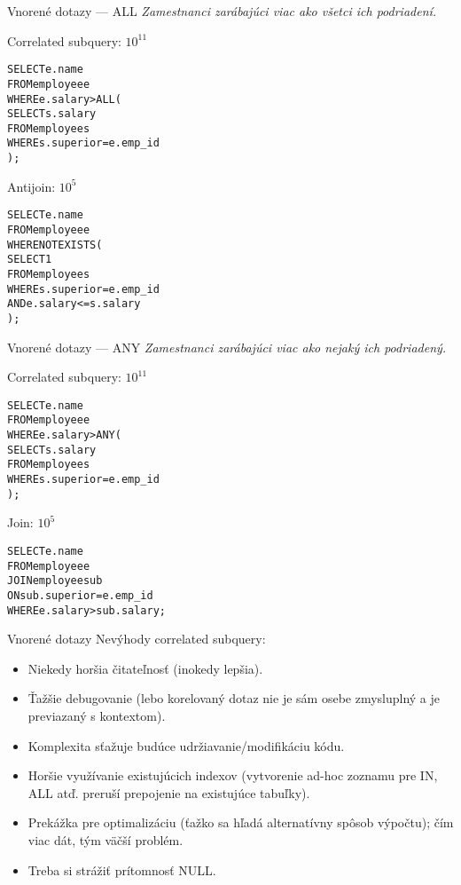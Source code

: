 \documentclass[12pt]{beamer}
\def\blue#1{\textcolor{Cerulean}{#1}}
\begin{document}
\begin{frame}[fragile]{Vnorené dotazy --- ALL}
\footnotesize
\emph{Zamestnanci zarábajúci viac ako všetci ich podriadení.}\\[7mm]
\begin{minipage}{.4\pdfpagewidth}
Correlated subquery: $10^{11}$
\footnotesize
\begin{alltt}
SELECT e.name
FROM employee e
WHERE e.salary > \blue{ALL} (
  SELECT s.salary
  FROM employee s
  WHERE s.superior = e.emp_id
);

\end{alltt}
\end{minipage}
\hfill\vline\hfill
\begin{minipage}{.4\pdfpagewidth}
Antijoin: $10^{5}$
\footnotesize
\begin{alltt}
SELECT e.name
FROM employee e
WHERE NOT EXISTS (
  SELECT 1
  FROM employee s
  WHERE s.superior = e.emp_id
  AND e.salary <= s.salary
);
\end{alltt}
\end{minipage}
\end{frame}

\begin{frame}[fragile]{Vnorené dotazy --- ANY}
\footnotesize
\emph{Zamestnanci zarábajúci viac ako nejaký ich podriadený.}\\[7mm]
\begin{minipage}{.4\pdfpagewidth}
Correlated subquery: $10^{11}$
\footnotesize
\begin{alltt}
SELECT e.name
FROM employee e
WHERE e.salary > \blue{ANY} (
  SELECT s.salary
  FROM employee s
  WHERE s.superior = e.emp_id
);
\end{alltt}
\end{minipage}
\hfill\vline\hfill
\begin{minipage}{.4\pdfpagewidth}
Join: $10^{5}$
\footnotesize
\begin{alltt}
SELECT e.name
FROM employee e
  JOIN employee sub
    ON sub.superior = e.emp_id
WHERE e.salary > sub.salary;


\end{alltt}
\end{minipage}
\end{frame}

\begin{frame}{Vnorené dotazy}
Nevýhody correlated subquery:
\begin{itemize}
\item Niekedy horšia čitateľnosť (inokedy lepšia).
\item Ťažšie debugovanie (lebo korelovaný dotaz nie je sám osebe zmysluplný a je previazaný s kontextom).
\item Komplexita sťažuje budúce udržiavanie/modifikáciu kódu.
\item Horšie využívanie existujúcich indexov (vytvorenie ad-hoc zoznamu pre IN, ALL atď. preruší prepojenie na existujúce tabuľky).
\item Prekážka pre optimalizáciu (ťažko sa hľadá alternatívny spôsob výpočtu); čím viac dát, tým väčší problém.
\item Treba si strážiť prítomnosť NULL.
\end{itemize}
\end{frame}
\end{document}
